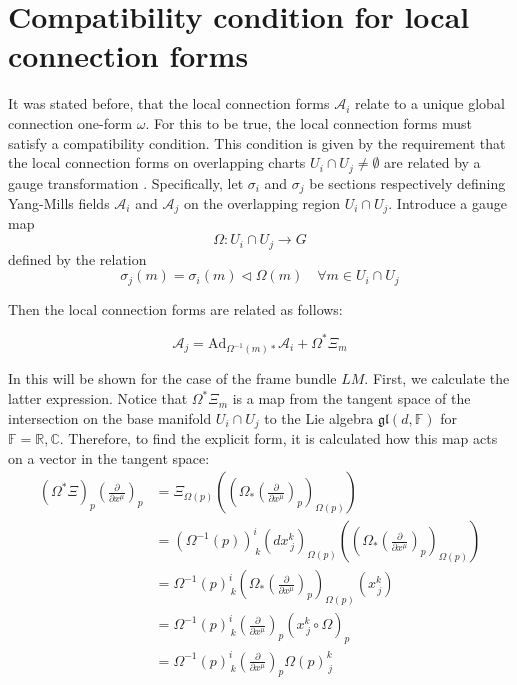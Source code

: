 \section{Compatibility condition for local connection forms}


It was stated before, that the local connection forms $\mathcal{A}_i$ relate to a unique global connection one-form $\omega$. For this to be true, the local connection forms must satisfy a compatibility condition. This condition is given by the requirement that the local connection forms on overlapping charts \( U_i \cap U_j \neq \emptyset\) are related by a gauge transformation \cite{NakaharaGeometrytopologyphysics2005}. Specifically, let $\sigma_i$ and $\sigma_j$ be sections respectively defining Yang-Mills fields \( \mathcal{A}_i \) and \( \mathcal{A}_j \) on the overlapping region \( U_i \cap U_j \). Introduce a gauge map
\[ \Omega : U_i \cap U_j \longrightarrow G \]
defined by the relation
\[ \sigma_j(m) = \sigma_i(m) \triangleleft \Omega(m) \quad \forall m \in U_i \cap U_j \]


Then the local connection forms are related as follows:

\[ \mathcal{A}_j = \text{Ad}_{\Omega^{-1}(m)*} \mathcal{A}_i + \Omega^*\Xi_m \]

In this will be shown for the case of the frame bundle \( LM \). First, we calculate the latter expression. Notice that \( \Omega^* \Xi_m \) is a map from the tangent space of the intersection on the base manifold \( U_i \cap U_j \) to the Lie algebra \( \mathfrak{gl}(d, \mathbb{F}) \) for $\mathbb{F} = \mathbb{R,C}$. Therefore, to find the explicit form, it is calculated how this map acts on a vector in the tangent space:
\begin{align*}
  (\Omega^* \Xi)_p \left( \frac{\partial}{\partial x^\mu} \right)_p 
  &= \Xi_{\Omega(p)}\left( \left( \Omega_* \left( \frac{\partial}{\partial x^\mu} \right)_p \right)_{\Omega(p)} \right) \\
  &= (\Omega^{-1}(p))^i_{\,k}(dx^k_{\,j})_{\Omega(p)}\left( \left( \Omega_* \left( \frac{\partial}{\partial x^\mu} \right)_p \right)_{\Omega(p)} \right) \\
  &= \Omega^{-1}(p)^i_{\,k} \left( \Omega_* \left( \frac{\partial}{\partial x^\mu} \right)_p \right)_{\Omega(p)} \left( x^k_{\,j} \right) \\
  &= \Omega^{-1}(p)^i_{\,k} \left( \frac{\partial}{\partial x^\mu}  \right)_p \left( x^k_{\,j} \circ \Omega \right)_p \\
  &= \Omega^{-1}(p)^i_{\,k} \left( \frac{\partial}{\partial x^\mu}  \right)_p \Omega(p)^k_{\,j}
\end{align*}

